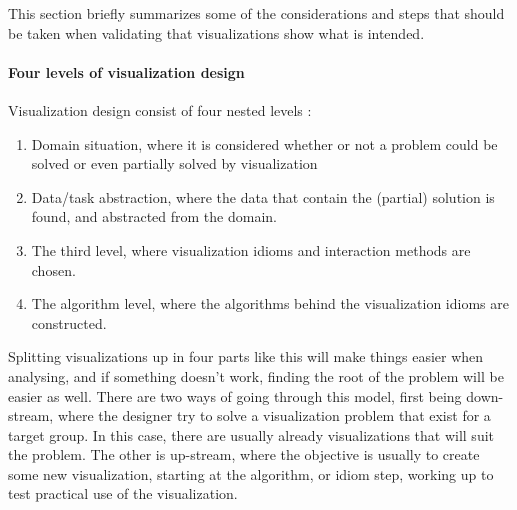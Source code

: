 \documentclass[Report.tex]{subfiles}
\begin{document}
	This section briefly summarizes some of the considerations and steps that should be taken when validating that visualizations show what is intended.
	\paragraph{Four levels of visualization design\\}
	Visualization design consist of four  nested levels \cite[68]{Tamara}:
	\begin{enumerate}
		\item Domain situation, where it is considered whether or not a problem could be solved or even partially solved by visualization
		\item Data/task abstraction, where the data that contain the (partial) solution is found, and abstracted from the domain.
		\item The third level, where visualization idioms and interaction methods are chosen.
		\item The algorithm level, where the algorithms behind the visualization idioms are constructed.
	\end{enumerate}
	Splitting visualizations up in four parts like this will make things easier when analysing, and if something doesn't work, finding the root of the problem will be easier as well.
	There are two ways of going through this model, first being down-stream, where the designer try to solve a visualization problem that exist for a target group. In this case, there are usually already visualizations that will suit the problem. The other is up-stream, where the objective is usually to create some new visualization, starting at the algorithm, or idiom step, working up to test practical use of the visualization.
	 
\end{document}
